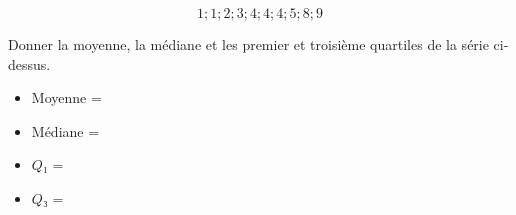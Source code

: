 \documentclass{automatisme}
\begin{document}
\begin{frame}
	$$ 1 ; 1 ; 2 ; 3 ; 4 ; 4 ; 4 ; 5 ; 8 ; 9 $$

	Donner la moyenne, la médiane et les premier et troisième quartiles de la série ci-dessus.

	\vspace{2em}
	\begin{itemize}
		\item[] Moyenne = 
		\item[] Médiane = 
		\item[] $Q₁$ = 
		\item[] $Q₃$ = 
	\end{itemize}
\end{frame}
\end{document}
